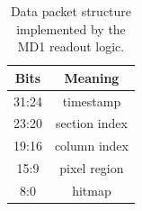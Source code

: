         \begin{table}
            \begin{center}
            \begin{tabular}{|c |c |}
            \hline
            Bits & Meaning  \\
            \hline
            \hline
            31:24 & timestamp\\
            23:20 & section index\\
            19:16 & column index\\
            15:9 & pixel region\\
            8:0 & hitmap\\
            \hline
            \end{tabular}
            \caption{Data packet structure implemented by the MD1 readout logic.}
            \label{tab:data_packet}
            \end{center}
        \end{table}

